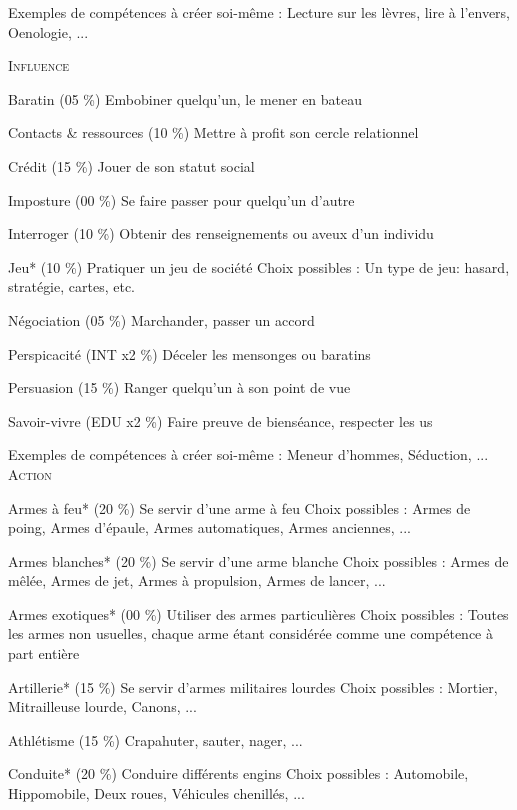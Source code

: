 \documentclass[11pt,twoside,a4paper]{article}
\begin{document}
\begin{multicols*}{2}
	Exemples de comp{\'e}tences {\`a} cr{\'e}er soi-m{\^e}me : 
	Lecture sur les l{\`e}vres, lire {\`a} l'envers, Oenologie, ... ~\\

\vfill
\columnbreak

\textsc{Influence}

	Baratin (05 \%)
	Embobiner quelqu'un, le mener en bateau
	
	Contacts \& ressources (10 \%)
	Mettre {\`a} profit son cercle relationnel
	
	Cr{\'e}dit (15 \%)
	Jouer de son statut social
	
	Imposture (00 \%)
	Se faire passer pour quelqu'un d'autre
	
	Interroger (10 \%)
	Obtenir des renseignements ou aveux d'un individu
	
	Jeu* (10 \%)
	Pratiquer un jeu de soci{\'e}t{\'e}
	Choix possibles : Un type de jeu: hasard, strat{\'e}gie, cartes, etc.
	
	N{\'e}gociation (05 \%)
	Marchander, passer un accord
	
	Perspicacit{\'e} (INT x2 \%)
	D{\'e}celer les mensonges ou baratins
	
	Persuasion (15 \%)
	Ranger quelqu'un {\`a} son point de vue
	
	Savoir-vivre (EDU x2 \%)
	Faire preuve de biens{\'e}ance, respecter les us
	
	Exemples de comp{\'e}tences {\`a} cr{\'e}er soi-m{\^e}me : 
	Meneur d'hommes, S{\'e}duction, ... ~\\

\textsc{Action}

	Armes {\`a} feu* (20 \%)
	Se servir d'une arme {\`a} feu
	Choix possibles : Armes de poing, Armes d'{\'e}paule, Armes automatiques, Armes anciennes, ...
	
	Armes blanches* (20 \%)
	Se servir d'une arme blanche
	Choix possibles : Armes de m{\^e}l{\'e}e, Armes de jet, Armes {\`a} propulsion, Armes de lancer, ...
	
	Armes exotiques* (00 \%)
	Utiliser des armes particuli{\`e}res
	Choix possibles : Toutes les armes non usuelles, chaque arme {\'e}tant consid{\'e}r{\'e}e comme une comp{\'e}tence {\`a} part enti{\`e}re
	
	Artillerie* (15 \%)
	Se servir d'armes militaires lourdes
	Choix possibles : Mortier, Mitrailleuse lourde, Canons, ...
	
	Athl{\'e}tisme (15 \%)
	Crapahuter, sauter, nager, ...
	
	Conduite* (20 \%)
	Conduire diff{\'e}rents engins
	Choix possibles : Automobile, Hippomobile, Deux roues, V{\'e}hicules chenill{\'e}s, ...
	

\end{multicols*}
\end{document}
